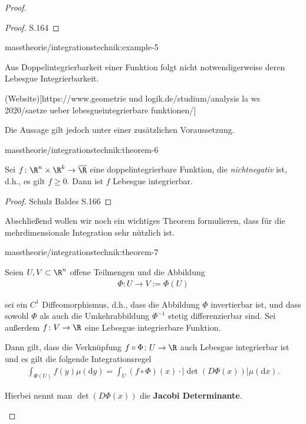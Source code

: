 \documentclass[letterpaper,10pt,english]{jupyterBook}
\begin{document}
\begin{proof}
\begin{proof}
 S.164
\end{proof}
\begin{example}{}{masstheorie/integrationstechnik:example-5}



\par
Aus Doppelintegrierbarkeit einer Funktion folgt nicht notwendigerweise deren Lebesgue Integrierbarkeit.

\par
(Website){[}https://www.geometrie und logik.de/studium/analysis la ws 2020/saetze ueber lebesgueintegrierbare funktionen/{]}
\end{example}

\par
Die Aussage gilt jedoch unter einer zusätzlichen Voraussetzung.
\begin{theorem}{}{masstheorie/integrationstechnik:theorem-6}



\par
Sei \(f \colon \R^{n} \times \R^k \rightarrow \overline{\R}\) eine doppelintegrierbare Funktion, die \emph{nichtnegativ} ist, d.h., es gilt \(f \geq 0\).
Dann ist \(f\) Lebesgue integrierbar.
\end{theorem}

\begin{proof}
 Schulz Baldes S.166
\end{proof}

\par
Abschließend wollen wir noch ein wichtiges Theorem formulieren, dass für die mehrdimensionale Integration sehr nützlich ist.
\begin{theorem}{}{masstheorie/integrationstechnik:theorem-7}



\par
Seien \(U, V \subset \R^n\) offene Teilmengen und die Abbildung
\begin{align*}
\Phi \colon U \rightarrow V := \Phi(U)
\end{align*}
\par
sei ein \(C^1\) Diffeomorphismus, d.h., dass die Abbildung \(\Phi\) invertierbar ist, und dass sowohl \(\Phi\) als auch die Umkehrabbildung \(\Phi^{-1}\) stetig differenzierbar sind.
Sei außerdem \(f \colon V \rightarrow \R\) eine Lebesgue integrierbare Funktion.

\par
Dann gilt, dass die Verknüpfung \(f \circ \Phi \colon U \rightarrow \R\) auch Lebesgue integrierbar ist und es gilt die folgende Integrationsregel
\begin{align*}
\int_{\Phi(U)} f(y) \mu(\mathrm{d}y) = \int_U (f \circ \Phi)(x) \cdot |\det(D\Phi(x))|\mu(\mathrm{d}x).\end{align*}
\par
Hierbei nennt man \(\det(D\Phi(x))\) die \textbf{Jacobi Determinante}.
\end{theorem}


\end{proof}
\end{document}
